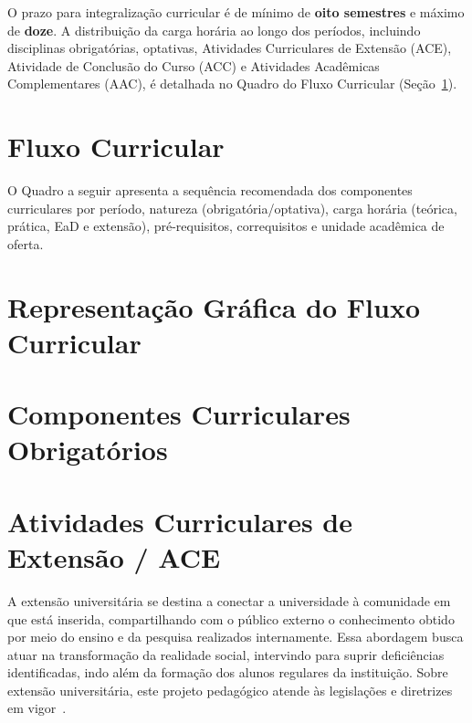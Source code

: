 O prazo para integralização curricular é de mínimo de \textbf{oito semestres} e máximo de \textbf{doze}. A distribuição da carga horária ao longo dos períodos, incluindo disciplinas obrigatórias, optativas, Atividades Curriculares de Extensão (ACE), Atividade de Conclusão do Curso (ACC) e Atividades Acadêmicas Complementares (AAC), é detalhada no Quadro do Fluxo Curricular (Seção~\ref{sec:fluxo}).

\section{Fluxo Curricular}
\label{sec:fluxo}

O Quadro a seguir apresenta a sequência recomendada dos componentes curriculares por período, natureza (obrigatória/optativa), carga horária (teórica, prática, EaD e extensão), pré-requisitos, correquisitos e unidade acadêmica de oferta.



\newpage
\section{Representação Gráfica do Fluxo Curricular}

\begin{landscape}

\end{landscape}

\newpage
\section{Componentes Curriculares Obrigatórios}


\section{Atividades Curriculares de Extensão / ACE}

A extensão universitária se destina a conectar a universidade à comunidade em que está inserida, compartilhando com o público externo o conhecimento obtido por meio do ensino e da pesquisa realizados internamente. Essa abordagem busca atuar na transformação da realidade social, intervindo para suprir deficiências identificadas, indo além da formação dos alunos regulares da instituição. Sobre extensão universitária, este projeto pedagógico atende às legislações e diretrizes em vigor~\cite{Lei:13005:2014,MEC:CNE:CES:7:2018,UFU:CONSUN:25:2019,UFU:CONGRAD:13:2019,UFU:CONSEX:5:2020}.

